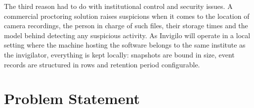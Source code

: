 \documentclass[12pt, a4paper]{report}
\begin{document}
\begin{justify}
{   The third reason had to do with institutional control and security issues. A commercial proctoring solution raises suspicions when it comes to the location of camera recordings, the person in charge of such files, their storage times and the model behind detecting any suspicious activity. As Invigilo will operate in a local setting where the machine hosting the software belongs to the same institute as the invigilator, everything is kept locally: snapshots are bound in size, event records are structured in rows and retention period configurable.
  }
\end{justify}

\section{Problem Statement}
\end{document}
